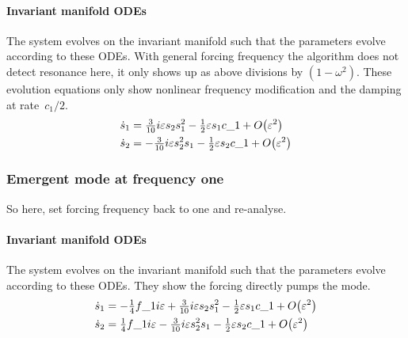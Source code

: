 \paragraph{Invariant manifold ODEs}
The system evolves on the invariant manifold such
that the parameters evolve according to these ODEs.
With general forcing frequency the algorithm does not detect resonance here, it only shows up as above divisions by \((1-\omega^2)\).
These evolution equations only show nonlinear frequency modification and the damping at rate~\(c_{1}/{2}\).
\begin{align*}&
\dot s_{1}=\tfrac{3}{10} i \varepsilon s_{2} s_{1}^{2}-\tfrac{1}{2} \varepsilon s_{1} c\_1+O\big(
\varepsilon ^{2}\big)
\\&{}
\dot s_{2}=-\tfrac{3}{10} i \varepsilon s_{2}^{2} s_{1}-\tfrac{1}{2} \varepsilon s_{2} c\_1+O\big(
\varepsilon ^{2}\big)
\end{align*}





\subsubsection{Emergent mode at frequency one}
So here, set forcing frequency back to one and re-analyse.

\paragraph{Invariant manifold ODEs}
The system evolves on the invariant manifold such
that the parameters evolve according to these ODEs.
They show the forcing directly pumps the mode.
\begin{align*}&
\dot s_{1}=-\tfrac{1}{4} f\_1 i \varepsilon+\tfrac{3}{10} i \varepsilon s_{2} s_{1}^{2}-\tfrac{1}{2} \varepsilon s_{1} 
c\_1+O\big(\varepsilon ^{2}\big)
\\&
\dot s_{2}=\tfrac{1}{4} f\_1 i \varepsilon-\tfrac{3}{10} i \varepsilon s_{2}^{2} s_{1}-\tfrac{1}{2} \varepsilon s_{2} 
c\_1+O\big(\varepsilon ^{2}\big)
\end{align*}





